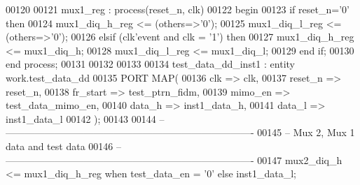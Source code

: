 \begin{DoxyCode}
00120 
00121  mux1\_reg : \textcolor{keywordflow}{process}(reset_n, clk)
00122 \textcolor{vhdlkeyword}{    begin}
00123       \textcolor{keywordflow}{if} \textcolor{vhdlchar}{reset_n}\textcolor{vhdlchar}{=}\textcolor{vhdlchar}{'}\textcolor{vhdllogic}{}\textcolor{vhdllogic}{0}\textcolor{vhdlchar}{'} \textcolor{keywordflow}{then}
00124          \textcolor{vhdlchar}{mux1_diq_h_reg} \textcolor{vhdlchar}{<=} \textcolor{vhdlchar}{(}\textcolor{keywordflow}{others}\textcolor{vhdlchar}{=}\textcolor{vhdlchar}{>}\textcolor{vhdlchar}{'}\textcolor{vhdllogic}{}\textcolor{vhdllogic}{0}\textcolor{vhdlchar}{'}\textcolor{vhdlchar}{)};
00125          \textcolor{vhdlchar}{mux1_diq_l_reg} \textcolor{vhdlchar}{<=} \textcolor{vhdlchar}{(}\textcolor{keywordflow}{others}\textcolor{vhdlchar}{=}\textcolor{vhdlchar}{>}\textcolor{vhdlchar}{'}\textcolor{vhdllogic}{}\textcolor{vhdllogic}{0}\textcolor{vhdlchar}{'}\textcolor{vhdlchar}{)};
00126       \textcolor{keywordflow}{elsif} \textcolor{vhdlchar}{(}\textcolor{vhdlchar}{clk}\textcolor{vhdlchar}{'}\textcolor{vhdlkeyword}{event} \textcolor{keywordflow}{and} \textcolor{vhdlchar}{clk} \textcolor{vhdlchar}{=} \textcolor{vhdlchar}{'}\textcolor{vhdllogic}{}\textcolor{vhdllogic}{1}\textcolor{vhdlchar}{'}\textcolor{vhdlchar}{)} \textcolor{keywordflow}{then}
00127           \textcolor{vhdlchar}{mux1_diq_h_reg} \textcolor{vhdlchar}{<=} \textcolor{vhdlchar}{mux1_diq_h};
00128           \textcolor{vhdlchar}{mux1_diq_l_reg} \textcolor{vhdlchar}{<=} \textcolor{vhdlchar}{mux1_diq_l};         
00129         \textcolor{keywordflow}{end} \textcolor{keywordflow}{if};
00130     \textcolor{keywordflow}{end} \textcolor{keywordflow}{process};
00131      
00132      
00133      
00134 test\_data\_dd\_inst1 : \textcolor{keywordflow}{entity} work.test_data_dd
00135   \textcolor{keywordflow}{PORT} \textcolor{keywordflow}{MAP}(
00136             clk             => clk,
00137             reset_n         => reset_n,
00138             fr_start            => test_ptrn_fidm,
00139             mimo_en         => test_data_mimo_en,
00140             data_h          => inst1_data_h,
00141             data_l          => inst1_data_l
00142         \textcolor{vhdlchar}{)};
00143           
00144 \textcolor{keyword}{-- ----------------------------------------------------------------------------}
00145 \textcolor{keyword}{-- Mux 2, Mux 1 data and test data}
00146 \textcolor{keyword}{-- ----------------------------------------------------------------------------        }
00147 \textcolor{vhdlchar}{mux2_diq_h} \textcolor{vhdlchar}{<=} \textcolor{vhdlchar}{mux1_diq_h_reg} \textcolor{keywordflow}{when} \textcolor{vhdlchar}{test_data_en} \textcolor{vhdlchar}{=} \textcolor{vhdlchar}{'}\textcolor{vhdllogic}{}\textcolor{vhdllogic}{0}\textcolor{vhdlchar}{'} \textcolor{keywordflow}{else} \textcolor{vhdlchar}{inst1_data_l};

\end{DoxyCode}
